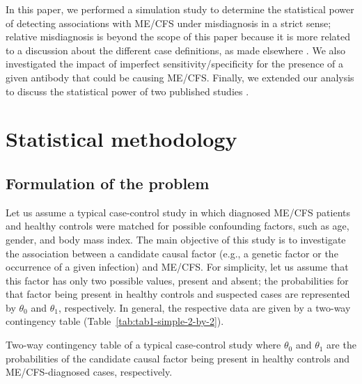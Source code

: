 In this paper, we performed a simulation study to determine the statistical power of detecting associations with ME/CFS under misdiagnosis in a strict sense; relative misdiagnosis is beyond the scope of this paper because it is more related to a discussion about the different case definitions, as made elsewhere \citep{brurberg2014CaseDefinitions, lim2020SystematicReviewa}. We also investigated the impact of imperfect sensitivity/specificity for the presence of a given antibody that could be causing ME/CFS. Finally, we extended our analysis to discuss the statistical power of two published studies \citep{cliff2019CellularImmune, steiner2020AutoimmunityRelatedRisk}.

\section{Statistical methodology}

\subsection{Formulation of the problem}

Let us assume a typical case-control study in which diagnosed ME/CFS patients and healthy controls were matched for possible confounding factors, such as age, gender, and body mass index. The main objective of this study is to investigate the association between a candidate causal factor (e.g., a genetic factor or the occurrence of a given infection) and ME/CFS. For simplicity, let us assume that this factor has only two possible values, present and absent; the probabilities for that factor being present in healthy controls and suspected cases are represented by $\theta_0$ and $\theta_1$, respectively. In general, the respective data are given by a two-way contingency table (Table~\ref{tab:tab1-simple-2-by-2}).

\begin{table}[h]
    \centering
    \caption[Two-way contingency table of a typical case-control study]{Two-way contingency table of a typical case-control study where $\theta_0$ and $\theta_1$ are the probabilities of the candidate causal factor being present in healthy controls and ME/CFS-diagnosed cases, respectively.}
    
    \label{tab:tab1-simple-2-by-2}
\end{table}

